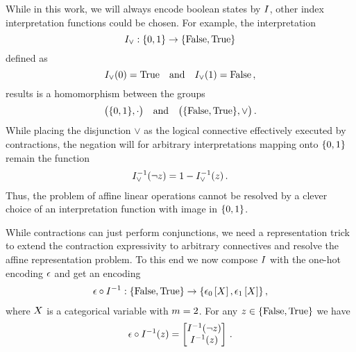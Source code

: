 While in this work, we will always encode boolean states by $I$, other index interpretation functions could be chosen.
For example, the interpretation
\[ I_{\lor}:\{0,1\}\rightarrow\{\mathrm{False},\mathrm{True}\} \]
defined as
\[ I_{\lor}(0) = \mathrm{True} \quad \text{and} \quad I_{\lor}(1) = \mathrm{False} \, , \]
results is a homomorphism between the groups
\[ \big(\{0,1\},\cdot\big) \quad \text{and} \quad \big(\{\mathrm{False},\mathrm{True}\},\lor\big)  \, . \]
While placing the disjunction $\lor$ as the logical connective effectively executed by contractions, the negation will for arbitrary interpretations mapping onto $\{0,1\}$ remain the function %
\begin{align*}
    I_{\lor}^{-1}(\lnot z) = 1 - I_{\lor}^{-1}(z)  \, .
\end{align*}
Thus, the problem of affine linear operations cannot be resolved by a clever choice of an interpretation function with image in $\{0,1\}$.



While contractions can just perform conjunctions, we need a representation trick to extend the contraction expressivity to arbitrary connectives and resolve the affine representation problem.
To this end we now compose $I$ with the one-hot encoding $\epsilon$ and get an encoding
\begin{align*}
    \epsilon\circ I^{-1} : \{\mathrm{False},\mathrm{True}\} \rightarrow \{\epsilon_0\left[X\right],\epsilon_1\left[X\right]\} \, ,
\end{align*}
where $X$ is a categorical variable with $m=2$.
For any $z\in\{\mathrm{False},\mathrm{True}\}$ we have
\begin{align*}
    \epsilon\circ I^{-1}(z) =
    \begin{bmatrix}
        I^{-1}(\lnot z) \\
        I^{-1}(z)
    \end{bmatrix}  \, .
\end{align*}


